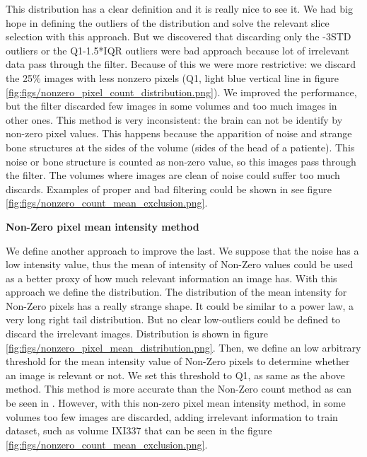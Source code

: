 
This distribution has a clear definition and it is really nice to see it. We had big hope in defining the outliers of the distribution and solve the relevant slice selection with this approach. But we discovered that discarding only the -3STD outliers or the Q1-1.5*IQR outliers were bad approach because lot of irrelevant data pass through the filter. Because of this we were more restrictive: we discard the 25\% images with less nonzero pixels (Q1, light blue vertical line in figure \ref{fig:figs/nonzero_pixel_count_distribution.png}). We improved the performance, but the filter discarded few images in some volumes and too much images in other ones. This method is very inconsistent: the brain can not be identify by non-zero pixel values. This happens because the apparition of noise and strange bone structures at the sides of the volume (sides of the head of a patiente). This noise or bone structure is counted as non-zero value, so this images pass through the filter. The volumes where images are clean of noise could suffer too much discards. Examples of proper and bad filtering could be shown in see figure \ref{fig:figs/nonzero_count_mean_exclusion.png}.

\textbf{Non-Zero pixel mean intensity method}

We define another approach to improve the last. We suppose that the noise has a low intensity value, thus the mean of intensity of Non-Zero values could be used as a better proxy of how much relevant information an image has. With this approach we define the distribution. The distribution of the mean intensity for Non-Zero pixels has a really strange shape. It could be similar to a power law, a very long right tail distribution. But no clear low-outliers could be defined to discard the irrelevant images. Distribution is shown in figure \ref{fig:figs/nonzero_pixel_mean_distribution.png}. Then, we define an low arbitrary threshold for the mean intensity value of Non-Zero pixels to determine whether an image is relevant or not. We set this threshold to Q1, as same as the above method. This method is more accurate than the Non-Zero count method as can be seen in . However, with this non-zero pixel mean intensity method, in some volumes too few images are discarded, adding irrelevant information to train dataset, such as volume IXI337 that can be seen in the figure \ref{fig:figs/nonzero_count_mean_exclusion.png}. 

